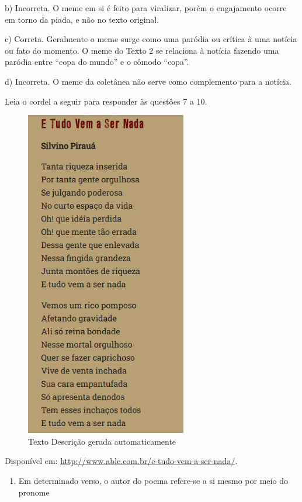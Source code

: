 b) Incorreta. O meme em si é feito para viralizar, porém o engajamento
ocorre em torno da piada, e não no texto original.

c) Correta. Geralmente o meme surge como uma paródia ou crítica à uma
notícia ou fato do momento. O meme do Texto 2 se relaciona à notícia
fazendo uma paródia entre ``copa do mundo'' e o cômodo ``copa''.

d) Incorreta. O meme da coletânea não serve como complemento para a
notícia.

Leia o cordel a seguir para responder às questões 7 a 10.

\begin{figure}
\centering
\includegraphics[width=2.77524in,height=5.66716in]{./imgSAEB_6_POR/media/image49.png}
\caption{Texto Descrição gerada automaticamente}
\end{figure}

Disponível em: \url{http://www.ablc.com.br/e-tudo-vem-a-ser-nada/}.

\begin{enumerate}
\def\labelenumi{\arabic{enumi}.}
\setcounter{enumi}{6}
\tightlist
\item
  Em determinado verso, o autor do poema refere-se a si mesmo por meio
  do pronome
\end{enumerate}

